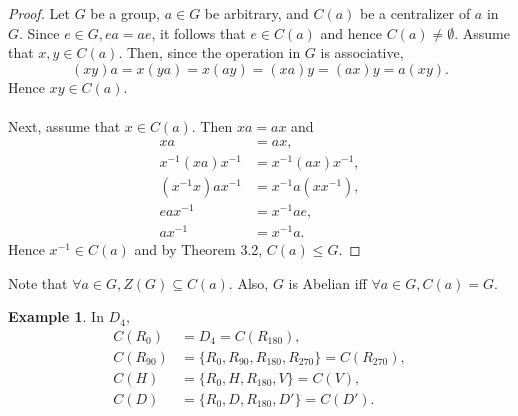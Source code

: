 \documentclass{article}
\newtheorem{theorem}{Theorem}[section]
\theoremstyle{definition}
\newtheorem{definition}{Definition}[section]
\newtheorem{example}{Example}[section]
\begin{document}
    \noindent{}
    
    \noindent{}
    
    \begin{proof}
        Let $G$ be a group, $a \in G$ be arbitrary, and $C(a)$ be a centralizer of $a$ in $G$. Since $e \in G, ea=ae$, it follows that $e \in C(a)$ and hence $C(a) \neq \emptyset$. Assume that $x,y \in C(a)$. Then, since the operation in $G$ is associative,
        \begin{equation*}
            (xy)a = x(ya) = x(ay) = (xa)y = (ax)y = a(xy).
        \end{equation*}
        Hence $xy \in C(a)$.
        \\ \\
        Next, assume that $x \in C(a)$. Then $xa = ax$ and
        \begin{align*}
            xa &= ax, \\
            x^{-1}(xa)x^{-1} &= x^{-1}(ax)x^{-1}, \\
            (x^{-1}x)ax^{-1} &= x^{-1}a(xx^{-1}), \\
            eax^{-1} &= x^{-1}ae, \\
            ax^{-1} &= x^{-1}a.
        \end{align*}
        Hence $x^{-1} \in C(a)$ and by Theorem 3.2, $C(a) \leq G$.
    \end{proof}
    
    Note that $\forall a \in G, Z(G) \subseteq C(a)$. Also, $G$ is Abelian iff $\forall a \in G, C(a) = G$.
    
    \begin{example}
        In $D_4$,
        \begin{align*}
            C(R_0) &= D_4 = C(R_{180}), \\
            C(R_{90}) &= \{R_0, R_{90}, R_{180}, R_{270}\} = C(R_{270}), \\
            C(H) &= \{R_0, H, R_{180}, V\} = C(V), \\
            C(D) &= \{R_0, D, R_{180}, D'\} = C(D').
        \end{align*}
    \end{example}
    
\end{document}
